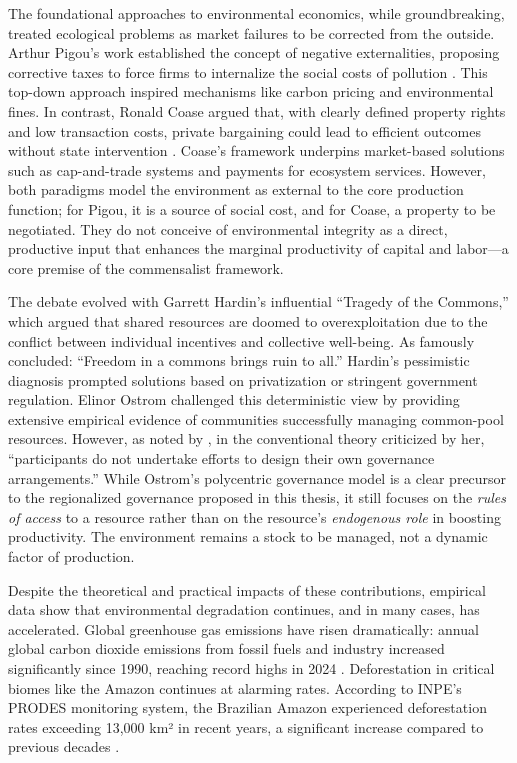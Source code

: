 \documentclass[a4paper,12pt,oneside,brazil,english]{abntex2}
\begin{document}
The foundational approaches to environmental economics, while groundbreaking, treated ecological problems as market failures to be corrected from the outside. Arthur Pigou's work established the concept of negative externalities, proposing corrective taxes to force firms to internalize the social costs of pollution \cite{pigou2010liberty}. This top-down approach inspired mechanisms like carbon pricing and environmental fines. In contrast, Ronald Coase argued that, with clearly defined property rights and low transaction costs, private bargaining could lead to efficient outcomes without state intervention \cite{coase1937nature}. Coase's framework underpins market-based solutions such as cap-and-trade systems and payments for ecosystem services. However, both paradigms model the environment as external to the core production function; for Pigou, it is a source of social cost, and for Coase, a property to be negotiated. They do not conceive of environmental integrity as a direct, productive input that enhances the marginal productivity of capital and labor---a core premise of the commensalist framework.

The debate evolved with Garrett Hardin's influential ``Tragedy of the Commons,'' which argued that shared resources are doomed to overexploitation due to the conflict between individual incentives and collective well-being. As  famously concluded: ``Freedom in a commons brings ruin to all.'' Hardin's pessimistic diagnosis prompted solutions based on privatization or stringent government regulation. Elinor Ostrom challenged this deterministic view by providing extensive empirical evidence of communities successfully managing common-pool resources. However, as noted by , in the conventional theory criticized by her, ``participants do not undertake efforts to design their own governance arrangements.'' While Ostrom's polycentric governance model \cite{ostrom1990governing} is a clear precursor to the regionalized governance proposed in this thesis, it still focuses on the \textit{rules of access} to a resource rather than on the resource's \textit{endogenous role} in boosting productivity. The environment remains a stock to be managed, not a dynamic factor of production.

Despite the theoretical and practical impacts of these contributions, empirical data show that environmental degradation continues, and in many cases, has accelerated. Global greenhouse gas emissions have risen dramatically: annual global carbon dioxide emissions from fossil fuels and industry increased significantly since 1990, reaching record highs in 2024 \cite{statista2024emissions}\cite{carbonbrief2024}. Deforestation in critical biomes like the Amazon continues at alarming rates. According to INPE's PRODES monitoring system, the Brazilian Amazon experienced deforestation rates exceeding 13,000 km² in recent years, a significant increase compared to previous decades \cite{inpe2021prodes}\cite{wwf2022deforestation}. 
\end{document}
